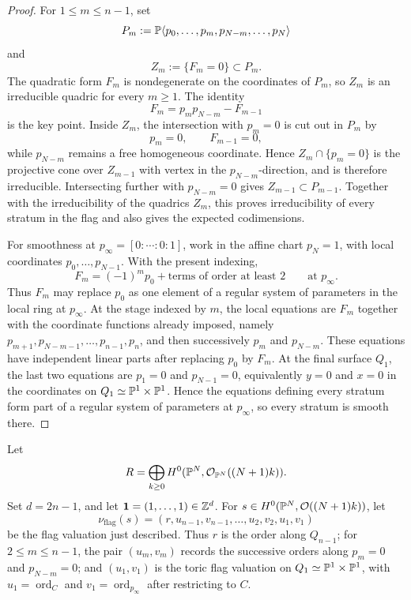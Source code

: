\begin{proof}
For \(1\le m\le n-1\), set
\[
P_m:=\mathbb{P}\langle p_0,\ldots,p_m,p_{N-m},\ldots,p_N\rangle
\]
and
\[
Z_m:=\{F_m=0\}\subset P_m.
\]
The quadratic form \(F_m\) is nondegenerate on the coordinates of \(P_m\), so \(Z_m\) is an irreducible quadric for every \(m\ge1\).
The identity
\[
F_m=p_mp_{N-m}-F_{m-1}
\]
is the key point.  Inside \(Z_m\), the intersection with \(p_m=0\) is cut out in \(P_m\) by
\[
p_m=0,\qquad F_{m-1}=0,
\]
while \(p_{N-m}\) remains a free homogeneous coordinate. Hence \(Z_m\cap\{p_m=0\}\) is the projective cone over \(Z_{m-1}\) with vertex in the \(p_{N-m}\)-direction, and is therefore irreducible. Intersecting further with \(p_{N-m}=0\) gives \(Z_{m-1}\subset P_{m-1}\). Together with the irreducibility of the quadrics \(Z_m\), this proves irreducibility of every stratum in the flag and also gives the expected codimensions.

For smoothness at \(p_\infty=[0:\cdots:0:1]\), work in the affine chart \(p_N=1\), with local coordinates \(p_0,\ldots,p_{N-1}\). With the present indexing,
\[
F_m=(-1)^mp_0+\text{terms of order at least }2
\qquad\text{at }p_\infty.
\]
Thus \(F_m\) may replace \(p_0\) as one element of a regular system of parameters in the local ring at \(p_\infty\). At the stage indexed by \(m\), the local equations are \(F_m\) together with the coordinate functions already imposed, namely \(p_{m+1},p_{N-m-1},\ldots,p_{n-1},p_n\), and then successively \(p_m\) and \(p_{N-m}\). These equations have independent linear parts after replacing \(p_0\) by \(F_m\). At the final surface \(Q_1\), the last two equations are \(p_1=0\) and \(p_{N-1}=0\), equivalently \(y=0\) and \(x=0\) in the coordinates on \(Q_1\simeq\mathbb{P}^1\times\mathbb{P}^1\). Hence the equations defining every stratum form part of a regular system of parameters at \(p_\infty\), so every stratum is smooth there.
\end{proof}

Let
\[
R=\bigoplus_{k\ge0}H^0(\mathbb{P}^N,\mathcal O_{\mathbb{P}^N}((N+1)k)).
\]
Set \(d=2n-1\), and let \(\mathbf 1=(1,\ldots,1)\in\mathbb{Z}^d\).
For \(s\in H^0(\mathbb{P}^N,\mathcal O((N+1)k))\), let
\[
\nu_{\mathrm{flag}}(s)=(r,u_{n-1},v_{n-1},\ldots,u_2,v_2,u_1,v_1)
\]
be the flag valuation just described. Thus \(r\) is the order along \(Q_{n-1}\); for \(2\le m\le n-1\), the pair \((u_m,v_m)\) records the successive orders along \(p_m=0\) and \(p_{N-m}=0\); and \((u_1,v_1)\) is the toric flag valuation on \(Q_1\simeq\mathbb{P}^1\times\mathbb{P}^1\), with \(u_1=\operatorname{ord}_C\) and \(v_1=\operatorname{ord}_{p_\infty}\) after restricting to \(C\).

